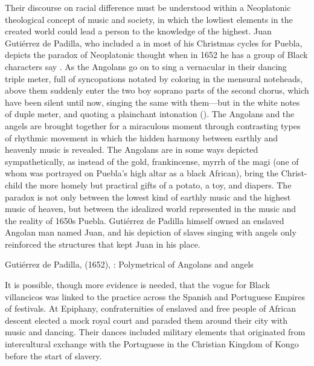 Their discourse on racial difference must be understood within a Neoplatonic
theological concept of music and society, in which the lowliest elements in the
created world could lead a person to the knowledge of the highest.
Juan Gutiérrez de Padilla, who included a  in most of
his Christmas cycles for Puebla, depicts the paradox of Neoplatonic thought
when in 1652 he has a group of Black characters say .
As the Angolans go on to sing a vernacular  in their
dancing triple meter, full of syncopations notated by coloring in the mensural
noteheads, above them suddenly enter the two boy soprano parts of the second
chorus, which have been silent until now, singing the same  with
them---but in the white notes of duple meter, and quoting a plainchant
intonation ().
The Angolans and the angels are brought together for a miraculous moment
through contrasting types of rhythmic movement in which the hidden harmony
between earthly and heavenly music is revealed.
The Angolans are in some ways depicted sympathetically, as instead
of the gold, frankincense, myrrh of the magi (one of whom was portrayed on
Puebla's high altar as a black African), bring the Christ-child the more homely
but practical gifts of a potato, a toy, and diapers.
The paradox is not only between the lowest kind of earthly music and the
highest music of heaven, but between the idealized world represented in the
music and the reality of 1650s Puebla.
Gutiérrez de Padilla himself owned an enslaved Angolan man named Juan, and
his depiction of slaves singing with angels only reinforced the structures that
kept Juan in his place.%
    \Autocite{Mauleon:PadillaCivil}


{Gutiérrez de Padilla,  (1652), :
Polymetrical  of Angolans and angels}

It is possible, though more evidence is needed, that the vogue for Black
villancicos was linked to the practice across the Spanish and Portuguese
Empires of  festivals.
At Epiphany, confraternities of enslaved and free people of African descent
elected a mock royal court and paraded them around their city with music and
dancing.%
    \Autocite{Fromont:DancingKingCongo}
Their dances included military elements that originated from intercultural
exchange with the Portuguese in the Christian Kingdom of Kongo before the start
of slavery.%
    \Autocites
    {Fromont:Kongo}

